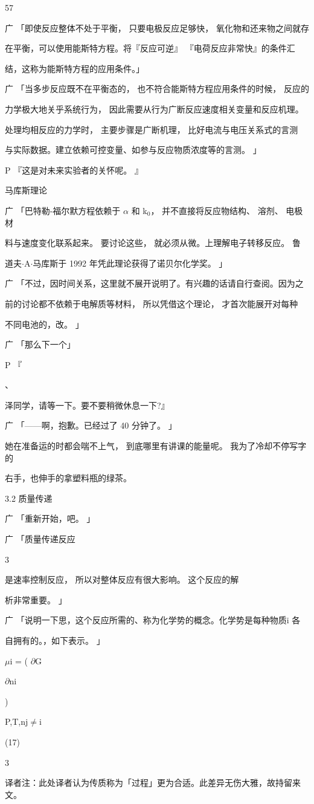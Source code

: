 57\par
广 「即使反应整体不处于平衡， 只要电极反应足够快， 氧化物和还来物之间就存\par
在平衡，可以使用能斯特方程。将『反应可逆』 『电荷反应非常快』的条件汇\par
结，这称为能斯特方程的应用条件。」\par
广 「当多步反应既不在平衡态的， 也不符合能斯特方程应用条件的时候， 反应的\par
力学极大地关乎系统行为， 因此需要从行为广断反应速度相关变量和反应机理。\par
处理均相反应的力学时， 主要步骤是广断机理， 比好电流与电压关系式的言测\par
与实际数据。建立依赖可控变量、如参与反应物质浓度等的言测。 」\par
P 『这是对未来实验者的关怀呢。 』\par
马库斯理论\par
广 「巴特勒-福尔默方程依赖于 $\alpha$ 和 k$_{0}$， 并不直接将反应物结构、 溶剂、 电极材\par
料与速度变化联系起来。 要讨论这些， 就必须从微。上理解电子转移反应。 鲁\par
道夫$\cdot$A$\cdot$马库斯于 1992 年凭此理论获得了诺贝尔化学奖。 」\par
广 「不过，因时间关系，这里就不展开说明了。有兴趣的话请自行查阅。因为之\par
前的讨论都不依赖于电解质等材料， 所以凭借这个理论， 才首次能展开对每种\par
不同电池的，改。 」\par
广 「那么下一个」\par
P 『\par
、\par
泽同学，请等一下。要不要稍微休息一下?』\par
广 「——啊，抱歉。已经过了 40 分钟了。 」\par
她在准备运的时都会喘不上气， 到底哪里有讲课的能量呢。 我为了冷却不停写字的\par
右手，也伸手的拿塑料瓶的绿茶。\par
3.2 质量传递\par
广 「重新开始，吧。 」\par
广 「质量传递反应\par
3\par
是速率控制反应， 所以对整体反应有很大影响。 这个反应的解\par
析非常重要。 」\par
广 「说明一下思，这个反应所需的、称为化学势的概念。化学势是每种物质i 各\par
自拥有的。，如下表示。 」\par
$\mu$i = ( $\partial$G\par
$\partial$ni\par
)\par
P,T,nj$\neq$i\par
(17)\par
3\par
译者注：此处译者认为传质称为「过程」更为合适。此差异无伤大雅，故持留来文。\par

